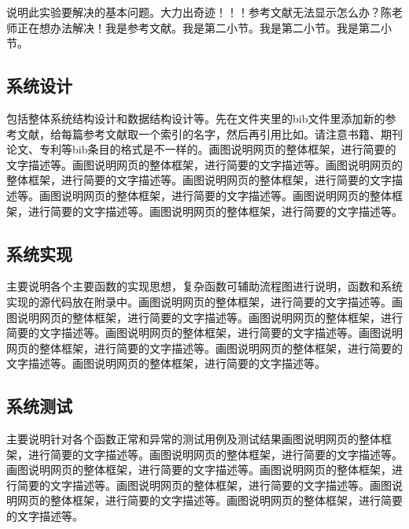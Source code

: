 \documentclass[supercite]{HustGraduPaper}
\theoremstyle{definition}
\begin{document}
    说明此实验要解决的基本问题。大力出奇迹！！！参考文献无法显示怎么办？陈老师正在想办法解决\cite{STR2021Neurocom, AVS2021Neurocom}！我是参考文献。我是第二小节\cite{Mehrabian1974An}。我是第二小节\cite{Rezaei2014CVPR}。我是第二小节\cite{Ramnath2008IJCV}。

    \subsection{系统设计}

    包括整体系统结构设计和数据结构设计等。先在文件夹里的bib文件里添加新的参考文献，给每篇参考文献取一个索引的名字，然后再引用比如\cite{STR2021Neurocom}\cite{AVS2021Neurocom, Rezaei2014CVPR}。请注意书籍、期刊论文、专利等bib条目的格式是不一样的。画图说明网页的整体框架，进行简要的文字描述等。画图说明网页的整体框架，进行简要的文字描述等。画图说明网页的整体框架，进行简要的文字描述等。画图说明网页的整体框架，进行简要的文字描述等。画图说明网页的整体框架，进行简要的文字描述等。画图说明网页的整体框架，进行简要的文字描述等。画图说明网页的整体框架，进行简要的文字描述等。

    \subsection{系统实现}

    主要说明各个主要函数的实现思想，复杂函数可辅助流程图进行说明，函数和系统实现的源代码放在附录中。画图说明网页的整体框架，进行简要的文字描述等。画图说明网页的整体框架，进行简要的文字描述等。画图说明网页的整体框架，进行简要的文字描述等。画图说明网页的整体框架，进行简要的文字描述等。画图说明网页的整体框架，进行简要的文字描述等。画图说明网页的整体框架，进行简要的文字描述等。画图说明网页的整体框架，进行简要的文字描述等。

    \subsection{系统测试}

    主要说明针对各个函数正常和异常的测试用例及测试结果画图说明网页的整体框架，进行简要的文字描述等。画图说明网页的整体框架，进行简要的文字描述等。画图说明网页的整体框架，进行简要的文字描述等。画图说明网页的整体框架，进行简要的文字描述等。画图说明网页的整体框架，进行简要的文字描述等。画图说明网页的整体框架，进行简要的文字描述等。画图说明网页的整体框架，进行简要的文字描述等。
\end{document}
